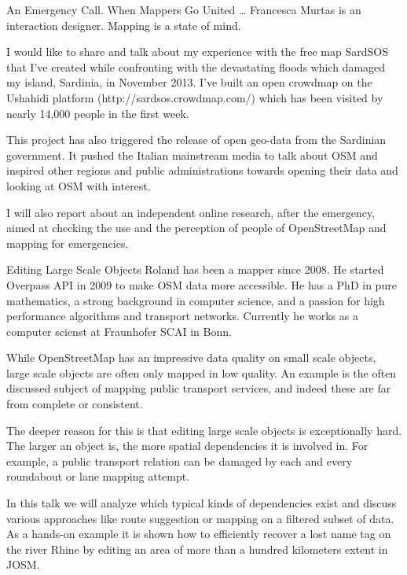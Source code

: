 %
{An Emergency Call. When Mappers Go United \dots}%
{Francesca Murtas is an interaction designer. Mapping is a state of mind.}%
{I would like to share and talk about my experience with the free map SardSOS that I've created while confronting with the devastating floods which damaged my island, Sardinia, in November 2013. I've built an open crowdmap on the Ushahidi platform (http://sardsos.crowdmap.com/) which has been visited by nearly 14,000 people in the first week.

This project has also triggered the release of open geo-data from the Sardinian government. It pushed the Italian mainstream media to talk about OSM and inspired other regions and public administrations towards opening their data and looking at OSM with interest.

I will also report about an independent online research, after the emergency, aimed at checking the use and the perception of people of OpenStreetMap and mapping for emergencies.}

%
{Editing Large Scale Objects}%
{Roland has been a mapper since 2008. He started Overpass API in 2009 to make OSM data more accessible. He has a PhD in pure mathematics, a strong background in computer science, and a passion for high performance algorithms and transport networks. Currently he works as a computer scienst at Fraunhofer SCAI in Bonn. }%
{While OpenStreetMap has an impressive data quality on small scale objects, large scale objects are often only mapped in low quality. An example is the often discussed subject of mapping public transport services, and indeed these are far from complete or consistent.

The deeper reason for this is that editing large scale objects is exceptionally hard. The larger an object is, the more spatial dependencies it is involved in. For example, a public transport relation can be damaged by each and every roundabout or lane mapping attempt.

In this talk we will analyze which typical kinds of dependencies exist and discuss various approaches like route suggestion or mapping on a filtered subset of data. As a hands-on example it is shown how to efficiently recover a lost name tag on the river Rhine by editing an area of more than a hundred kilometers extent in JOSM.}

